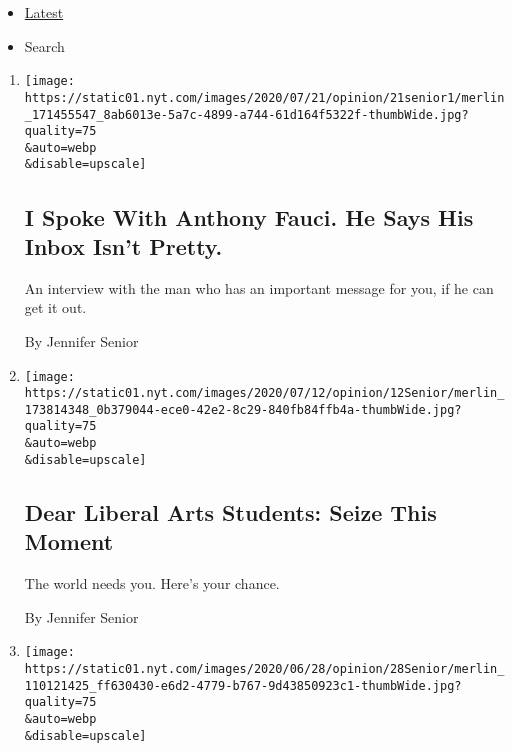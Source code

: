 \begin{itemize}
\tightlist
\item
  \protect\hyperlink{stream-panel}{Latest}
\item
  Search
\end{itemize}

\begin{enumerate}
\def\labelenumi{\arabic{enumi}.}
\item
  \href{/2020/07/21/opinion/anthony-fauci-coronavirus.html}{}

  \texttt{[image: https://static01.nyt.com/images/2020/07/21/opinion/21senior1/merlin\_171455547\_8ab6013e-5a7c-4899-a744-61d164f5322f-thumbWide.jpg?quality=75\\\&auto=webp\\\&disable=upscale]}

  \hypertarget{i-spoke-with-anthony-fauci-he-says-his-inbox-isnt-pretty}{%
  \subsection{I Spoke With Anthony Fauci. He Says His Inbox Isn't
  Pretty.}\label{i-spoke-with-anthony-fauci-he-says-his-inbox-isnt-pretty}}

  An interview with the man who has an important message for you, if he
  can get it out.

  By Jennifer Senior
\item
  \href{/2020/07/12/opinion/liberal-arts-college-covid.html}{}

  \texttt{[image: https://static01.nyt.com/images/2020/07/12/opinion/12Senior/merlin\_173814348\_0b379044-ece0-42e2-8c29-840fb84ffb4a-thumbWide.jpg?quality=75\\\&auto=webp\\\&disable=upscale]}

  \hypertarget{dear-liberal-arts-students-seize-this-moment}{%
  \subsection{Dear Liberal Arts Students: Seize This
  Moment}\label{dear-liberal-arts-students-seize-this-moment}}

  The world needs you. Here's your chance.

  By Jennifer Senior
\item
  \href{/2020/06/28/opinion/trump-newt-gingrich.html}{}

  \texttt{[image: https://static01.nyt.com/images/2020/06/28/opinion/28Senior/merlin\_110121425\_ff630430-e6d2-4779-b767-9d43850923c1-thumbWide.jpg?quality=75\\\&auto=webp\\\&disable=upscale]}

  \hypertarget{trumps-napalm-politics-they-began-with-newt}{%
}
\end{enumerate}
